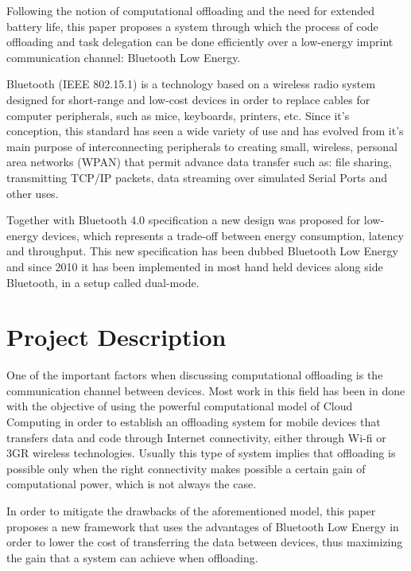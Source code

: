 
Following the notion of computational offloading and the need for extended battery life, this paper proposes a system through which the process of code offloading and task delegation can be done efficiently over a low-energy imprint communication channel: Bluetooth Low Energy. 

Bluetooth (IEEE 802.15.1) is a technology based on a wireless radio system designed for short-range and low-cost devices in order to replace cables for computer peripherals, such as mice, keyboards, printers, etc. Since it's conception, this standard has seen a wide variety of use and has evolved from it's main purpose of interconnecting peripherals to creating small, wireless, personal area networks (WPAN) that permit advance data transfer such as: file sharing, transmitting TCP/IP packets, data streaming over simulated Serial Ports and other uses.

Together with Bluetooth 4.0 specification a new design was proposed for low-energy devices, which represents a trade-off between energy consumption, latency and throughput. This new specification has been dubbed Bluetooth Low Energy  and since 2010 it has been implemented in most hand held devices along side Bluetooth, in a setup called dual-mode.

\section{Project Description}
\label{projectdescription}

One of the important factors when discussing computational offloading is the communication channel between devices. Most work in this field has been in done with the objective of using the powerful computational model of Cloud Computing\cite{kumar2010cloud} in order to establish an offloading system for mobile devices that transfers data and code through Internet connectivity, either through Wi-fi or 3GR wireless technologies. Usually this type of system implies that offloading is possible only when the right connectivity makes possible a certain gain of computational power, which is not always the case.

In order to mitigate the drawbacks of the aforementioned model, this paper proposes a new framework that uses the advantages of Bluetooth Low Energy in order to lower the cost of transferring the data between devices, thus maximizing the gain that a system can achieve when offloading.

